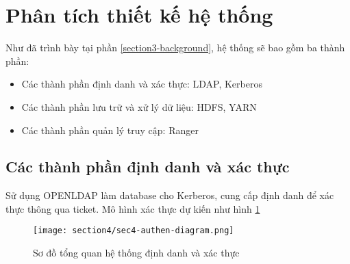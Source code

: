 \section{Phân tích thiết kế hệ thống}
\label{section4-method}

Như đã trình bày tại phần \ref{section3-background}, hệ thống sẽ bao gồm ba thành phần:
\begin{itemize}
    \item Các thành phần định danh và xác thực: LDAP, Kerberos
    \item Các thành phần lưu trữ và xử lý dữ liệu: HDFS, YARN
    \item Các thành phần quản lý truy cập: Ranger
\end{itemize}

\subsection{Các thành phần định danh và xác thực}

Sử dụng OPENLDAP làm database cho Kerberos, cung cấp định danh để xác thực thông qua ticket. Mô hình xác thực dự kiến như hình \ref{fig:sec4-authen-diagram}

\begin{figure}
    \centering
    \texttt{[image: section4/sec4-authen-diagram.png]}
    \caption{Sơ đồ tổng quan hệ thống định danh và xác thực}
    \label{fig:sec4-authen-diagram}
\end{figure}